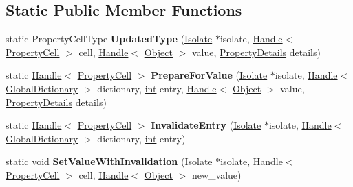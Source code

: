 \subsection*{Static Public Member Functions}
\begin{DoxyCompactItemize}
\item 
\mbox{\label{classv8_1_1internal_1_1PropertyCell_a80939ecb94b1be3388000a2733f6c7d4}} 
static Property\+Cell\+Type {\bfseries Updated\+Type} (\mbox{\hyperlink{classv8_1_1internal_1_1Isolate}{Isolate}} $\ast$isolate, \mbox{\hyperlink{classv8_1_1internal_1_1Handle}{Handle}}$<$ \mbox{\hyperlink{classv8_1_1internal_1_1PropertyCell}{Property\+Cell}} $>$ cell, \mbox{\hyperlink{classv8_1_1internal_1_1Handle}{Handle}}$<$ \mbox{\hyperlink{classv8_1_1internal_1_1Object}{Object}} $>$ value, \mbox{\hyperlink{classv8_1_1internal_1_1PropertyDetails}{Property\+Details}} details)
\item 
\mbox{\label{classv8_1_1internal_1_1PropertyCell_a7a0de225d78dc1b37cd5e73d0dc96bf7}} 
static \mbox{\hyperlink{classv8_1_1internal_1_1Handle}{Handle}}$<$ \mbox{\hyperlink{classv8_1_1internal_1_1PropertyCell}{Property\+Cell}} $>$ {\bfseries Prepare\+For\+Value} (\mbox{\hyperlink{classv8_1_1internal_1_1Isolate}{Isolate}} $\ast$isolate, \mbox{\hyperlink{classv8_1_1internal_1_1Handle}{Handle}}$<$ \mbox{\hyperlink{classv8_1_1internal_1_1GlobalDictionary}{Global\+Dictionary}} $>$ dictionary, \mbox{\hyperlink{classint}{int}} entry, \mbox{\hyperlink{classv8_1_1internal_1_1Handle}{Handle}}$<$ \mbox{\hyperlink{classv8_1_1internal_1_1Object}{Object}} $>$ value, \mbox{\hyperlink{classv8_1_1internal_1_1PropertyDetails}{Property\+Details}} details)
\item 
\mbox{\label{classv8_1_1internal_1_1PropertyCell_a2ff1840a627ae8d94a09d33c891e202c}} 
static \mbox{\hyperlink{classv8_1_1internal_1_1Handle}{Handle}}$<$ \mbox{\hyperlink{classv8_1_1internal_1_1PropertyCell}{Property\+Cell}} $>$ {\bfseries Invalidate\+Entry} (\mbox{\hyperlink{classv8_1_1internal_1_1Isolate}{Isolate}} $\ast$isolate, \mbox{\hyperlink{classv8_1_1internal_1_1Handle}{Handle}}$<$ \mbox{\hyperlink{classv8_1_1internal_1_1GlobalDictionary}{Global\+Dictionary}} $>$ dictionary, \mbox{\hyperlink{classint}{int}} entry)
\item 
\mbox{\label{classv8_1_1internal_1_1PropertyCell_ab1511bccfbc7e27b3057148773dc9cab}} 
static void {\bfseries Set\+Value\+With\+Invalidation} (\mbox{\hyperlink{classv8_1_1internal_1_1Isolate}{Isolate}} $\ast$isolate, \mbox{\hyperlink{classv8_1_1internal_1_1Handle}{Handle}}$<$ \mbox{\hyperlink{classv8_1_1internal_1_1PropertyCell}{Property\+Cell}} $>$ cell, \mbox{\hyperlink{classv8_1_1internal_1_1Handle}{Handle}}$<$ \mbox{\hyperlink{classv8_1_1internal_1_1Object}{Object}} $>$ new\+\_\+value)
\end{DoxyCompactItemize}
